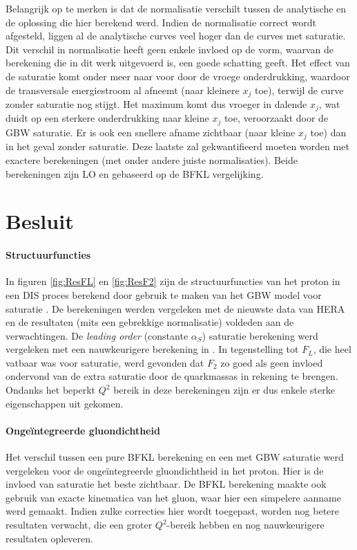 \documentclass[a4paper,11pt]{article}
\numberwithin{equation}{section} %
\begin{document}
Belangrijk op te merken is dat de normalisatie verschilt tussen de analytische en de oplossing die hier berekend werd.
Indien de normalisatie correct wordt afgesteld, liggen al de analytische curves veel hoger dan de curves met saturatie.
Dit verschil in normalisatie heeft geen enkele invloed op de vorm, waarvan de berekening die in dit werk uitgevoerd is, een goede schatting geeft.
Het effect van de saturatie komt onder meer naar voor door de vroege onderdrukking, waardoor de transversale energiestroom al afneemt (naar kleinere $x_j$ toe), terwijl de curve zonder saturatie nog stijgt.
Het maximum komt dus vroeger in dalende $x_j$, wat duidt op een sterkere onderdrukking naar kleine $x_j$ toe, veroorzaakt door de GBW saturatie.
Er is ook een snellere afname zichtbaar (naar kleine $x_j$ toe) dan in het geval zonder saturatie.
Deze laatste zal gekwantifieerd moeten worden met exactere berekeningen (met onder andere juiste normalisaties).
Beide berekeningen zijn LO en gebaseerd op de BFKL vergelijking.

\section{Besluit}
      \paragraph{Structuurfuncties}
In figuren \ref{fig:ResFL} en \ref{fig:ResF2} zijn de structuurfuncties van het proton in een DIS proces berekend door gebruik te maken van het GBW model voor saturatie \cite{GB} \cite{GBW}.
De berekeningen werden vergeleken met de nieuwste data van HERA \cite{H1} \cite{ZEUS} en de resultaten (mits een gebrekkige normalisatie) voldeden aan de verwachtingen.
De \textit{leading order} (constante $\alpha_S$) saturatie berekening werd vergeleken met een nauwkeurigere berekening in \cite{Stasto}.
In tegenstelling tot $F_L$, die heel vatbaar was voor saturatie, werd gevonden dat $F_2$ zo goed als geen invloed ondervond van de extra saturatie door de quarkmassas in rekening te brengen.
Ondanks het beperkt $Q^2$ bereik in deze berekeningen zijn er dus enkele sterke eigenschappen uit gekomen.

      \paragraph{Ongeïntegreerde gluondichtheid}
Het verschil tussen een pure BFKL berekening en een met GBW saturatie werd vergeleken voor de ongeïntegreerde gluondichtheid in het proton.
Hier is de invloed van saturatie het beste zichtbaar.
De BFKL berekening maakte ook gebruik van exacte kinematica van het gluon, waar hier een simpelere aanname werd gemaakt.
Indien zulke correcties hier wordt toegepast, worden nog betere resultaten verwacht, die een groter $Q^2$-bereik hebben en nog nauwkeurigere resultaten opleveren.
\end{document}
